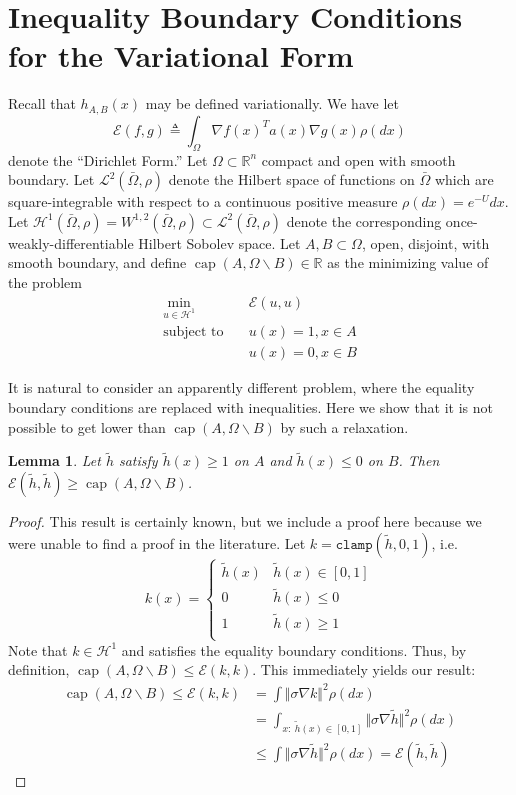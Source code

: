 \documentclass[12pt, nofootinbib,english, amsmath, amssymb, aps, priprint, graphicx,floatfix]{revtex4-1}
\newtheorem{lemma}{Lemma}
\theoremstyle{plain}
\theoremstyle{definition}
\theoremstyle{plain}
\newcommand{\capac}[2]{\ensuremath{\operatorname{cap}}(#1,#2)}
\begin{document}
{%
%
%
%
%
%
%
%
%
%
\section{Inequality Boundary Conditions for the Variational Form}
\label{sec:inequalityboundaryvar}

Recall that $h_{A,B}(x)$ may be defined variationally.  We have let
%
\[
\mathscr{E}(f,g)\triangleq \int_\Omega \nabla f(x)^T a(x) \nabla g(x) \rho(dx)
\]
%
denote the ``Dirichlet Form.''  Let $\Omega \subset \mathbb{R}^n$ compact and open with smooth boundary.  Let $\mathscr L^2(\bar \Omega,\rho)$ denote the Hilbert space of functions on $\bar \Omega$ which are square-integrable with respect to a continuous positive measure $\rho(dx)=e^{-U}dx$.  Let $\mathcal{H}^1(\bar \Omega,\rho)=W^{1,2}(\bar \Omega,\rho) \subset \mathscr{L}^2(\bar \Omega,\rho)$ denote the corresponding once-weakly-differentiable Hilbert Sobolev space.  Let $A,B\subset \Omega$, open, disjoint, with smooth boundary, and define $\capac{A}{\Omega \backslash B} \in \mathbb{R}$ as the minimizing value of the problem
    \begin{align*}
    \min_{u \in \mathcal H^1} \quad & \mathscr{E}(u,u) \\
    \mbox{subject to} \quad & u(x)=1,x\in A \\
     & u(x)=0,x\in B
    \end{align*}

It is natural to consider an apparently different problem, where the equality boundary conditions are replaced with inequalities.  Here we show that it is not possible to get lower than $\capac{A}{\Omega \backslash B}$ by such a relaxation.

\begin{lemma} \label{lem:inequalityboundaryvar} Let $\tilde h$ satisfy $\tilde h(x)\geq 1$ on $A$ and $\tilde h(x)\leq 0$ on $B$.  Then $\mathscr{E}(\tilde h,\tilde h) \geq \capac{A}{\Omega \backslash B}$.
\end{lemma}
\begin{proof}
This result is certainly known, but we include a proof here because we were unable to find a proof in the literature.  Let $k=\mathtt{clamp}(\tilde h,0,1)$, i.e.
\[
k(x)=
\begin{cases}
\tilde h(x) & \tilde h(x)\in[0,1] \\
0 & \tilde h(x)\leq 0 \\
1 & \tilde h(x)\geq 1 \\
\end{cases}
\]
Note that $k\in \mathcal{H}^1$ and satisfies the equality boundary conditions.  Thus, by definition, $\capac{A}{\Omega \backslash B} \leq \mathscr{E}(k,k)$.  This immediately yields our result:
\begin{align*}
\capac{A}{\Omega \backslash B} \leq \mathscr{E}(k,k) &= \int \Vert \sigma \nabla k \Vert^2 \rho(dx) \\
    &=\int_{x:\ \tilde h(x)\in[0,1]} \Vert \sigma \nabla \tilde h \Vert^2 \rho(dx) \\
    &\leq \int \Vert \sigma \nabla \tilde h \Vert^2 \rho(dx) = \mathscr{E}(\tilde h,\tilde h)
\end{align*}



\end{proof}}
\end{document}
